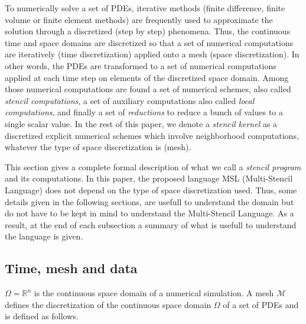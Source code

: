To numerically solve a set of PDEs, iterative methods (finite difference, finite volume or finite element methods) are frequently used to approximate the solution through a discretized (step by step) phenomena. Thus, the continuous time and space domains are discretized so that a set of numerical computations are iteratively (time discretization) applied onto a mesh (space discretization). In other words, the PDEs are transformed to a set of numerical computations applied at each time step on elements of the discretized space domain. Among those numerical computations are found a set of numerical schemes, also called \textit{stencil computations}, a set of auxiliary computations also called \emph{local computations}, and finally a set of \emph{reductions} to reduce a bunch of values to a single scalar value. In the rest of this paper, we denote a \emph{stencil kernel} as a discretized explicit numerical schemes which involve neighborhood computations, whatever the type of space discretization is (mesh).

This section gives a complete formal description of what we call a \textit{stencil program} and its computations. In this paper, the proposed language MSL (Multi-Stencil Language) does not depend on the type of space discretization used. Thus, some details given in the following sections, are usefull to understand the domain but do not have to be kept in mind to understand the Multi-Stencil Language. As a result, at the end of each subsection a summary of what is usefull to understand the language is given.

\subsection{Time, mesh and data}

$\Omega=\mathbb{R}^n$ is the continuous space domain of a numerical simulation. %
A mesh $\mathcal{M}$ defines the discretization of the continuous space domain $\Omega$ of a set of PDEs and is defined as follows.

